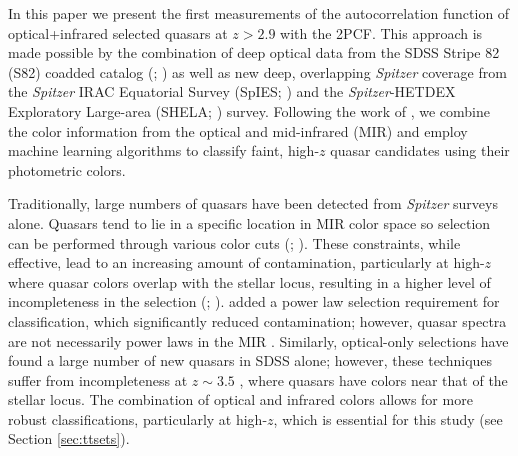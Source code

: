 \documentclass[apj, numberedappendix]{emulateapj}
\begin{document}
In this paper we present the first measurements of the autocorrelation function of optical+infrared selected quasars at $z>2.9$ with the 2PCF. This approach is made possible by the combination of deep optical data from the SDSS Stripe 82 (S82) coadded catalog (\citealt{Annis2014}; \citealt{Jiang2014}) as well as new deep, overlapping \emph{Spitzer} coverage from the \emph{Spitzer} IRAC Equatorial Survey (SpIES; \citealt{Timlin2016}) and the \emph{Spitzer}-HETDEX Exploratory Large-area (SHELA; \citealt{Papovich2016}) survey. Following the work of \citet{Richards2015}, we combine the color information from the optical and mid-infrared (MIR) and employ machine learning algorithms to classify faint, high-$z$ quasar candidates using their photometric colors.

Traditionally, large numbers of quasars have been detected from \emph{Spitzer} surveys alone. Quasars tend to lie in a specific location in MIR color space so selection can be performed through various color cuts (\citealt{Lacy2004}; \citealt{Stern2005}). These constraints, while effective, lead to an increasing amount of contamination, particularly at high-$z$ where quasar colors overlap with the stellar locus, resulting in a higher level of incompleteness in the selection (\citealt{Assef2010}; \citealt{Donley2012}). \citet{Donley2012} added a power law selection requirement for classification, which significantly reduced contamination; however, quasar spectra are not necessarily power laws in the MIR \citep{Richards2015}. Similarly, optical-only selections have found a large number of new quasars in SDSS alone; however, these techniques suffer from incompleteness at $z \sim 3.5$  \citep{Richards2006, Worseck2011}, where quasars have colors near that of the stellar locus. The combination of optical and infrared colors allows for more robust classifications, particularly at high-$z$, which is essential for this study (see Section \ref{sec:ttsets}).  
\end{document}
